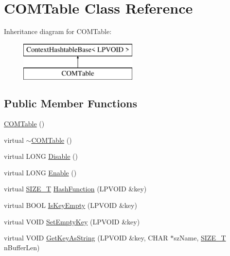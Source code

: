 \hypertarget{class_c_o_m_table}{\section{C\-O\-M\-Table Class Reference}
\label{class_c_o_m_table}
}
Inheritance diagram for C\-O\-M\-Table\-:\begin{figure}[H]
\begin{center}
\leavevmode
\includegraphics[height=2.000000cm]{class_c_o_m_table}
\end{center}
\end{figure}
\subsection*{Public Member Functions}
\begin{DoxyCompactItemize}
\item 
\hyperlink{class_c_o_m_table_a5b8538b41da1f397f387a7032785ac2a}{C\-O\-M\-Table} ()
\item 
virtual \hyperlink{class_c_o_m_table_acf95fee0165e53ddedb236ebf444a3e0}{$\sim$\-C\-O\-M\-Table} ()
\item 
virtual L\-O\-N\-G \hyperlink{class_c_o_m_table_a884eb78e6e7193ca819476915662d209}{Disable} ()
\item 
virtual L\-O\-N\-G \hyperlink{class_c_o_m_table_a4a112a1da2bf8ccb3401b8d4d5e39f17}{Enable} ()
\item 
virtual \hyperlink{_stack_walker_8h_abf8e46e57d5b85295601cefa33de3b7a}{S\-I\-Z\-E\-\_\-\-T} \hyperlink{class_c_o_m_table_aade63cce0c610906eab6beced9743456}{Hash\-Function} (L\-P\-V\-O\-I\-D \&key)
\item 
virtual B\-O\-O\-L \hyperlink{class_c_o_m_table_a27314e7b3e7a31dca666e1eede8224a7}{Is\-Key\-Empty} (L\-P\-V\-O\-I\-D \&key)
\item 
virtual V\-O\-I\-D \hyperlink{class_c_o_m_table_adc5f2622f44f301d57506077232abc5d}{Set\-Empty\-Key} (L\-P\-V\-O\-I\-D \&key)
\item 
virtual V\-O\-I\-D \hyperlink{class_c_o_m_table_ab8ffe1624f74c203be66d988483be7ed}{Get\-Key\-As\-String} (L\-P\-V\-O\-I\-D \&key, C\-H\-A\-R $\ast$sz\-Name, \hyperlink{_stack_walker_8h_abf8e46e57d5b85295601cefa33de3b7a}{S\-I\-Z\-E\-\_\-\-T} n\-Buffer\-Len)
\end{DoxyCompactItemize}

